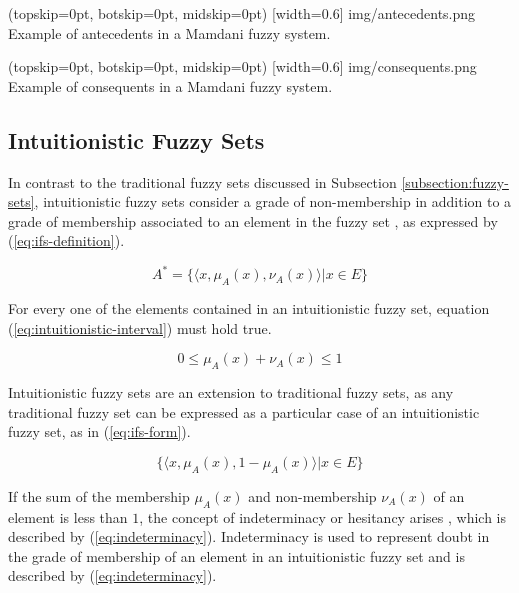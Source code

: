﻿\documentclass{ieeeaccess}
\begin{document}
\Figure[](topskip=0pt, botskip=0pt, midskip=0pt)
[width=0.6\linewidth]
{img/antecedents.png}
{Example of antecedents in a Mamdani fuzzy system.
  \label{figure:antecedents}}

\Figure[](topskip=0pt, botskip=0pt, midskip=0pt)
[width=0.6\linewidth]
{img/consequents.png}
{Example of consequents in a Mamdani fuzzy system.
  \label{figure:consequents}}

\subsection{Intuitionistic Fuzzy Sets}
\label{subsection:intuitionistic-fuzzy-sets}

In contrast to the traditional fuzzy sets discussed in Subsection
\ref{subsection:fuzzy-sets}, intuitionistic fuzzy sets consider a grade of
non-membership in addition to a grade of membership associated to an element in
the fuzzy set \cite{Atanassov1986}, as expressed by (\ref{eq:ifs-definition}).

\begin{equation}
  \label{eq:ifs-definition}
  A^{*} = \{\langle x, \mu _{A} (x), \nu _{A} (x) \rangle | x \in E\}
\end{equation}

For every one of the elements contained in an intuitionistic fuzzy set, 
equation (\ref{eq:intuitionistic-interval}) must hold true.

\begin{equation}
  \label{eq:intuitionistic-interval}
  0 \leq \mu_{A}(x) + \nu_{A}(x) \leq 1
\end{equation}

Intuitionistic fuzzy sets are an extension to traditional fuzzy sets, as any
traditional fuzzy set can be expressed as a particular case of an intuitionistic
fuzzy set, as in (\ref{eq:ifs-form}).

\begin{equation}
  \label{eq:ifs-form}
  \{ \langle x, \mu_{A}(x), 1 - \mu_{A}(x) \rangle | x \in E \}
\end{equation}

If the sum of the membership $\mu_{A}(x)$ and non-membership $\nu_{A}(x)$ of an
element is less than $1$, the concept of indeterminacy or hesitancy arises \cite{Atanassov1986},
which is described by (\ref{eq:indeterminacy}). Indeterminacy is used to represent
doubt in the grade of membership of an element in an intuitionistic fuzzy set
and is described by (\ref{eq:indeterminacy}).
\end{document}
